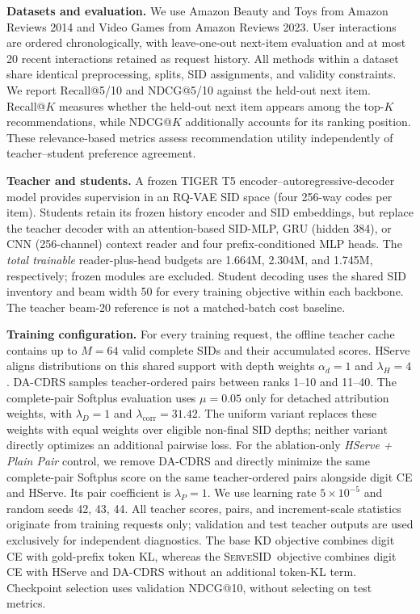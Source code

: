 \documentclass[sigconf, anonymous, review]{acmart}
\newcommand{\method}{\textsc{ServeSID}}
\begin{document}
\textbf{Datasets and evaluation.} We use Amazon Beauty and Toys from
Amazon Reviews 2014 and Video Games from Amazon Reviews 2023. User
interactions are ordered chronologically, with leave-one-out next-item
evaluation and at most 20 recent interactions retained as request
history. All methods within a dataset share identical preprocessing, splits, SID assignments, and validity constraints. We report Recall@5/10 and NDCG@5/10 against the held-out next item. Recall@$K$ measures whether the held-out next item appears among the top-$K$ recommendations, while NDCG@$K$ additionally accounts for its ranking position. These relevance-based metrics assess recommendation utility independently of teacher--student preference agreement.

\textbf{Teacher and students.} A frozen TIGER T5
encoder--autoregressive-decoder model provides supervision in
an RQ-VAE SID space (four 256-way codes per item).
Students retain its frozen history encoder and SID embeddings,
but replace the teacher decoder with an attention-based SID-MLP,
GRU (hidden 384), or CNN (256-channel) context reader and
four prefix-conditioned MLP heads. The \emph{total trainable}
reader-plus-head budgets are 1.664M, 2.304M, and 1.745M,
respectively; frozen modules are excluded. Student decoding
uses the shared SID inventory and beam width 50 for every
training objective within each backbone. The teacher beam-20
reference is not a matched-batch cost baseline.

\textbf{Training configuration.} For every training request, the
offline teacher cache contains up to $M=64$ valid complete SIDs and
their accumulated scores. HServe aligns distributions on this shared
support with depth weights $\alpha_d=1$ and $\lambda_H=4$. DA-CDRS samples teacher-ordered pairs between ranks 1--10 and
11--40. The complete-pair Softplus evaluation uses $\mu=0.05$ only
for detached attribution weights, with $\lambda_D=1$ and
$\lambda_{\mathrm{corr}}=31.42$. The uniform variant replaces these
weights with equal weights over eligible non-final SID depths;
neither variant directly optimizes an additional pairwise loss.
For the ablation-only \emph{HServe + Plain Pair} control, we remove DA-CDRS
and directly minimize the same complete-pair Softplus score on the
same teacher-ordered pairs alongside digit CE and HServe. Its pair
coefficient is $\lambda_P=1$.
We use learning rate $5\times10^{-5}$ and random seeds 42, 43, 44. All teacher scores, pairs, and
increment-scale statistics originate from training requests only;
validation and test teacher outputs are used exclusively for
independent diagnostics. The base KD objective combines digit CE with
gold-prefix token KL, whereas the \method\ objective combines digit CE
with HServe and DA-CDRS without an additional token-KL term. Checkpoint selection uses validation NDCG@10, without selecting on test metrics.
\end{document}
